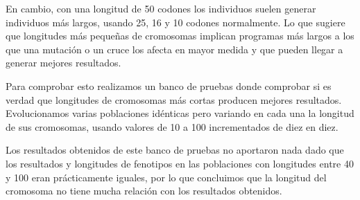 En cambio, con una longitud de 50 codones los individuos suelen generar individuos más largos, usando 25, 16 y 10 codones normalmente. Lo que sugiere que longitudes más pequeñas de cromosomas implican programas más largos a los que una mutación o un cruce los afecta en mayor medida y que pueden llegar a generar mejores resultados.

Para comprobar esto realizamos un banco de pruebas donde comprobar si es verdad que longitudes de cromosomas más cortas producen mejores resultados. Evolucionamos varias poblaciones idénticas pero variando en cada una la longitud de sus cromosomas, usando valores de 10 a 100 incrementados de diez en diez.

Los resultados obtenidos de este banco de pruebas no aportaron nada dado que los resultados y longitudes de fenotipos en las poblaciones con longitudes entre 40 y 100 eran prácticamente iguales, por lo que concluimos que la longitud del cromosoma no tiene mucha relación con los resultados obtenidos.

